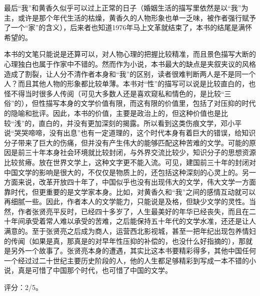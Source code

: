 最后“我”和黄香久似乎可以过上正常的日子（婚姻生活的描写里依然是以“我”为主，或许是那个年代生活的枯燥，黄香久的人物形象也单一乏味，被作者强行赋予了一个“家”的含义），后来者也知道1976年马上文革就结束了，本书的结尾是满怀希望的。

本书的文笔只能说是还算可以，对人物心理的把握比较精准，而且景色描写大断的心理独白也属于作家中不错的。然而作为小说，本书最大的缺点是夹叙夹议的风格造成了割裂，让人分不清作者本身和“我”的区别，读者很难判断两人是不是同一个人？而且其他人物的形象都比较单薄。本书对“性”的描写可以说是比较直白的，也怪不得当时很多人传阅（可见大多数人还是喜欢窥私和情色的，是比较“三俗”的），但性描写本身的文学价值有限，而这有限的价值里，包括了对压抑的时代的隐喻和批评。因此，本书的价值，主要是政治上的，但这种价值也是比较“浅”的，直白的，并没有更加深刻的揭露。所以看到这类伤痕文学，邓小平说“哭哭啼啼，没有出息”也有一定道理的，这个时代本身有着巨大的错误，给知识分子带来了巨大的伤痛，但并没有产生伟大的能够匹配这种苦难的文学。可能的原因是前三十年本身社会环境就比较封闭，与外界交流比较少，知识分子的思想资源比较贫瘠。放在世界文学上，这种文字更不能入流。可见，建国前三十年的封闭对中国文学的影响是很大的，不仅仅是物质上的，还包括这种深刻的心灵上的。另一方面来说，改革开放四十年了，中国似乎也没有出现伟大的文学，伟大文学一方面靠时代，但更重要的是文学家本身。比如，对黄香久和“我”之间的感情互动就可以再细腻一些。因此，作者本人的文学能力，只能说是及格，但缺少文学的灵性。当然，作者张贤亮平反时，已经四十多岁了，人生最美好的年华已经丧失，而且在二十年间承受着常人难以承受的苦难，之后能保持五十年代的文学水准，还还是让人满意的。至于张贤亮之后成为商人，运营西北影视城，甚至一把年纪出现包养情妇的传闻（如果是真，那真是的对早年性压抑的补偿的，也没什么好指摘的），那就是另外一个故事了。张贤亮本身的遭遇，其实比这本书要精彩得多，其他中国任何一个经过过二十世纪主要历史阶段的人，他的人生都足够精彩到写成一本不错的小说，真是可惜了中国那个时代，也可惜了中国的文学。

评分：2/5。
